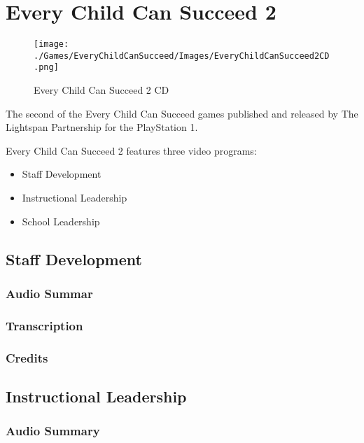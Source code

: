 \chapter{Every Child Can Succeed 2}

\begin{figure}[H]
    \centering
    \texttt{[image: ./Games/EveryChildCanSucceed/Images/EveryChildCanSucceed2CD.png]}
    \caption{Every Child Can Succeed 2 CD}
\end{figure}

The second of the Every Child Can Succeed games published and released by The Lightspan Partnership for the PlayStation 1.

Every Child Can Succeed 2 features three video programs:

\begin{itemize}
    \item Staff Development
    \item Instructional Leadership
    \item School Leadership
\end{itemize}

\clearpage
\newpage

\section{Staff Development}

\subsection{Audio Summar}

\subsection{Transcription}

\subsection{Credits}

\section{Instructional Leadership}

\subsection{Audio Summary}

